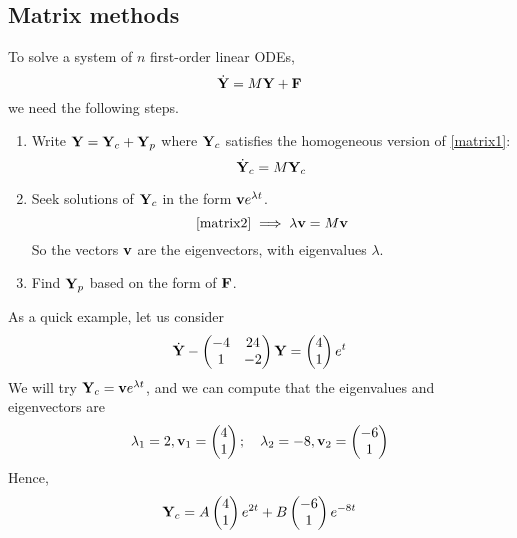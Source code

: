 \subsection{Matrix methods}
To solve a system of \(n\) first-order linear ODEs,
\begin{equation}\label{matrix1}
	\dot {\vb Y} = M\vb Y + \vb F
\end{equation}
we need the following steps.
\begin{enumerate}
	\item Write \(\vb Y = \vb Y_c + \vb Y_p\) where \(\vb Y_c\) satisfies the homogeneous version of \eqref{matrix1}:
	      \begin{equation}\label{matrix2}
		      \dot {\vb Y}_c = M\vb Y_c
	      \end{equation}
	\item Seek solutions of \(\vb Y_c\) in the form \(\vb v e^{\lambda t}\).
	      \[
		      \eqref{matrix2} \implies \lambda \vb v = M\vb v
	      \]
	      So the vectors \(\vb v\) are the eigenvectors, with eigenvalues \(\lambda\).
	\item Find \(\vb Y_p\) based on the form of \(\vb F\).
\end{enumerate}
As a quick example, let us consider
\begin{equation}\label{matrixexample}
	\dot {\vb Y} - \begin{pmatrix}
		-4 & 24 \\ 1 & -2
	\end{pmatrix}\vb Y = \begin{pmatrix}
		4 \\ 1
	\end{pmatrix}e^t
\end{equation}
We will try \(\vb Y_c = \vb v e^{\lambda t}\), and we can compute that the eigenvalues and eigenvectors are
\[
	\lambda_1 = 2, \vb v_1 = \begin{pmatrix}
		4 \\ 1
	\end{pmatrix};\quad \lambda_2 = -8, \vb v_2 = \begin{pmatrix}
		-6 \\ 1
	\end{pmatrix}
\]
Hence,
\[
	\vb Y_c = A\begin{pmatrix}
		4 \\ 1
	\end{pmatrix}e^{2t} + B\begin{pmatrix}
		-6 \\ 1
	\end{pmatrix}e^{-8t}
\]
